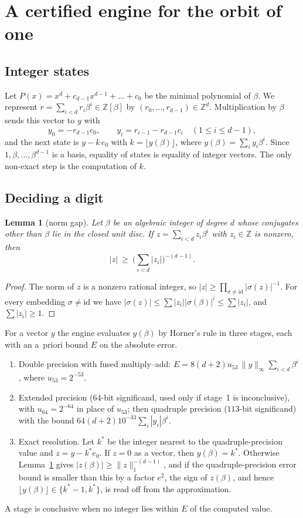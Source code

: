 \documentclass[11pt]{amsart}
\newtheorem{lemma}[theorem]{Lemma}
\theoremstyle{definition}
\theoremstyle{remark}
\newcommand{\Z}{\mathbb Z}
\begin{document}
\section{A certified engine for the orbit of one}\label{sec:engine}

\subsection{Integer states}
Let $P(x)=x^d+c_{d-1}x^{d-1}+\dots+c_0$ be the minimal polynomial of $\beta$. We represent $r=\sum_{i<d}r_i\beta^i\in\Z[\beta]$ by $(r_0,\dots,r_{d-1})\in\Z^d$. Multiplication by $\beta$ sends this vector to $y$ with
\[
y_0=-r_{d-1}c_0,\qquad y_i=r_{i-1}-r_{d-1}c_i\quad(1\le i\le d-1),
\]
and the next state is $y-k\,e_0$ with $k=\lfloor y(\beta)\rfloor$, where $y(\beta)=\sum_iy_i\beta^i$. Since $1,\beta,\dots,\beta^{d-1}$ is a basis, equality of states is equality of integer vectors. The only non-exact step is the computation of $k$.

\subsection{Deciding a digit}
\begin{lemma}[norm gap]\label{lem:normgap}
Let $\beta$ be an algebraic integer of degree $d$ whose conjugates other than $\beta$ lie in the closed unit disc. If $z=\sum_{i<d}z_i\beta^i$ with $z_i\in\Z$ is nonzero, then
\[
|z|\ \ge\ \Big(\sum_{i<d}|z_i|\Big)^{-(d-1)}.
\]
\end{lemma}
\begin{proof}
The norm of $z$ is a nonzero rational integer, so $|z|\ge\prod_{\sigma\neq\mathrm{id}}|\sigma(z)|^{-1}$. For every embedding $\sigma\ne\mathrm{id}$ we have $|\sigma(z)|\le\sum|z_i||\sigma(\beta)|^i\le\sum|z_i|$, and $\sum|z_i|\ge1$.
\end{proof}

For a vector $y$ the engine evaluates $y(\beta)$ by Horner's rule in three stages, each with an a~priori bound $E$ on the absolute error.
\begin{enumerate}
\item Double precision with fused multiply--add: $E=8(d+2)u_{53}\,\|y\|_\infty\sum_{i<d}\beta^i$, where $u_{53}=2^{-53}$.
\item Extended precision ($64$-bit significand, used only if stage~1 is inconclusive), with $u_{64}=2^{-64}$ in place of $u_{53}$; then quadruple precision ($113$-bit significand) with the bound $64(d+2)10^{-33}\sum_i|y_i|\beta^i$.
\item Exact resolution. Let $k^*$ be the integer nearest to the quadruple-precision value and $z=y-k^*e_0$. If $z=0$ as a vector, then $y(\beta)=k^*$. Otherwise Lemma~\ref{lem:normgap} gives $|z(\beta)|\ge\|z\|_1^{-(d-1)}$, and if the quadruple-precision error bound is smaller than this by a factor $e^2$, the sign of $z(\beta)$, and hence $\lfloor y(\beta)\rfloor\in\{k^*-1,k^*\}$, is read off from the approximation.
\end{enumerate}
A stage is conclusive when no integer lies within $E$ of the computed value.
\end{document}
